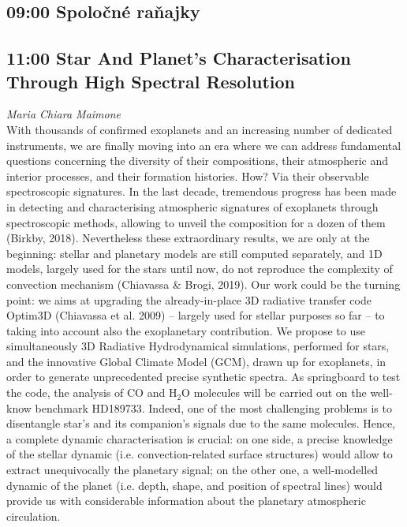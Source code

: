 \documentclass[a4paper]{report}
\begin{document}
                                    \begin{tcolorbox}
                            \subsection{09:00 \hfill Spoločné raňajky}
                                                            \end{tcolorbox}
                                                \begin{tcolorbox}
                            \subsection{11:00 \hfill Star And Planet’s Characterisation Through High Spectral Resolution}
                                    \hfill \textit{Maria Chiara Maimone} \\
                                                    With thousands of confirmed exoplanets and an increasing number of dedicated instruments, we are finally moving into an era where we can address fundamental questions concerning the diversity of their compositions, their atmospheric and interior processes, and their formation histories. How? Via their observable spectroscopic signatures. In the last decade, tremendous progress has been made in detecting and characterising atmospheric signatures of exoplanets through spectroscopic methods, allowing to unveil the composition for a dozen of them (Birkby, 2018).
Nevertheless these extraordinary results, we are only at the beginning: stellar and planetary models are still computed separately, and 1D models, largely used for the stars until now, do not reproduce the complexity of convection mechanism (Chiavassa \& Brogi, 2019). Our work could be the turning point: we aims at upgrading the already-in-place 3D radiative transfer code Optim3D (Chiavassa et al. 2009) -- largely used for stellar purposes so far -- to taking into account also the exoplanetary contribution. We propose to use simultaneously 3D Radiative Hydrodynamical simulations, performed for stars, and the innovative Global Climate Model (GCM), drawn up for exoplanets, in order to generate unprecedented precise synthetic spectra. As springboard to test the code, the analysis of CO and $\mathrm{H}_2\mathrm{O}$ molecules will be carried out on the well-know benchmark HD189733. Indeed, one of the most challenging problems is to disentangle star’s and its companion’s signals due to the same molecules. Hence, a complete dynamic characterisation is crucial: on one side, a precise knowledge of the stellar dynamic (i.e. convection-related surface structures) would allow to extract unequivocally the planetary signal; on the other one, a well-modelled dynamic of the planet (i.e. depth, shape, and position of spectral lines) would provide us with considerable information about the planetary atmospheric circulation.

                                            \end{tcolorbox}
                        
\end{document}
